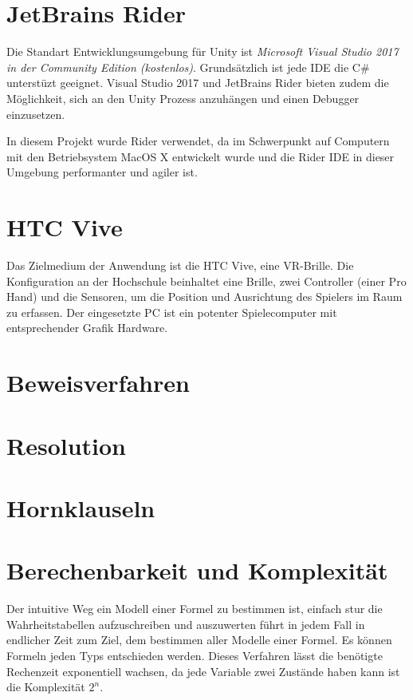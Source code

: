 \section{JetBrains Rider}
\label{Rider}
Die Standart Entwicklungsumgebung für Unity ist \emph{Microsoft Visual Studio 2017 in der Community Edition (kostenlos)}. Grundsätzlich ist jede IDE die C\# unterstüzt geeignet. Visual Studio 2017 und JetBrains Rider bieten zudem die Möglichkeit, sich an den Unity Prozess anzuhängen und einen Debugger einzusetzen. 

In diesem Projekt wurde Rider verwendet, da im Schwerpunkt auf Computern mit den Betriebsystem MacOS X entwickelt wurde und die Rider IDE in dieser Umgebung performanter und agiler ist.


\section{HTC Vive}
\label{Vive}
Das Zielmedium der Anwendung ist die HTC Vive, eine VR-Brille. Die Konfiguration an der Hochschule beinhaltet eine Brille, zwei Controller (einer Pro Hand) und die Sensoren, um die Position und Ausrichtung des Spielers im Raum zu erfassen. 
Der eingesetzte PC ist ein potenter Spielecomputer mit entsprechender Grafik Hardware. 

\section{Beweisverfahren}
\label{Beweisverfahren}

\section{Resolution}
\label{Resolution_aussage}


\section{Hornklauseln}
\label{Hornklauseln}



\section{Berechenbarkeit und Komplexität}
\label{Berechenbarkeit und Komplexität}

Der intuitive Weg ein Modell einer Formel zu bestimmen ist, einfach stur die Wahrheitstabellen aufzuschreiben und auszuwerten führt in jedem Fall in endlicher Zeit zum Ziel, dem bestimmen aller Modelle einer Formel. Es können Formeln jeden Typs entschieden werden. Dieses Verfahren lässt die benötigte Rechenzeit exponentiell wachsen, da jede Variable zwei Zustände haben kann ist die Komplexität $2^{n}$. \linebreak

